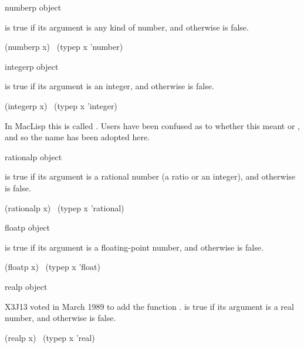 \begin{defun}[Function]
numberp object

 is true if its argument is any kind of number,
and otherwise is false.
\begin{lisp}
(numberp x) \EQ\ (typep x 'number)
\end{lisp}
\end{defun}

\begin{defun}[Function]
integerp object

 is true if its argument is an integer, and otherwise
is false.
\begin{lisp}
(integerp x) \EQ\ (typep x 'integer)
\end{lisp}

\beforenoterule
\begin{incompatibility}
In MacLisp this is called .
Users have been confused as to whether this meant 
or , and so the name  has been adopted here.
\end{incompatibility}
\afternoterule
\end{defun}

\begin{defun}[Function]
rationalp object

 is true if its argument is a rational number (a ratio or
an integer), and otherwise is false.
\begin{lisp}
(rationalp x) \EQ\ (typep x 'rational)
\end{lisp}
\end{defun}

\begin{defun}[Function]
floatp object

 is true if its argument is a floating-point number,
and otherwise is false.
\begin{lisp}
(floatp x) \EQ\ (typep x 'float)
\end{lisp}
\end{defun}


\begin{newer}
\begin{defun}[Function]
realp object

X3J13 voted in March 1989  to add the function .
 is true if its argument is a real number,
and otherwise is false.
\begin{lisp}
(realp x) \EQ\ (typep x 'real)
\end{lisp}
\end{defun}
\end{newer}

